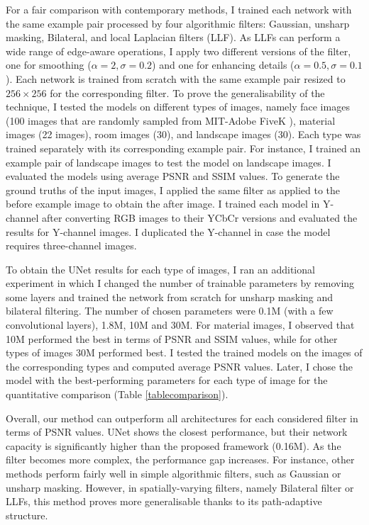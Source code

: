 For a fair comparison with contemporary methods, I trained each network with the same example pair processed by four algorithmic filters: Gaussian, unsharp masking, Bilateral, and local Laplacian filters (\gls{LLF}). As LLFs can perform a wide range of edge-aware operations, I apply two different versions of the filter, one for smoothing ($\alpha=2,  \sigma=0.2$) and one for enhancing details ($\alpha=0.5, \sigma=0.1$). Each network is trained from scratch with the same example pair resized to $256 \times 256$ for the corresponding filter. 
To prove the generalisability of the technique, I tested the models on different types of images, namely face images (100 images that are randomly sampled from MIT-Adobe FiveK \cite{Bychkovsky11Learning}), material images (22 images), room images (30), and landscape images (30). Each type was trained separately with its corresponding example pair. For instance, I trained an example pair of landscape images to test the model on landscape images. I evaluated the models using average PSNR and SSIM values. To generate the ground truths of the input images, I applied the same filter as applied to the before example image to obtain the after image. I trained each model in Y-channel after converting RGB images to their YCbCr versions and evaluated the results for Y-channel images. I duplicated the Y-channel in case the model requires three-channel images. 


To obtain the UNet results for each type of images, I ran an additional experiment in which I changed the number of trainable parameters by removing some layers and trained the network from scratch for unsharp masking and bilateral filtering. The number of chosen parameters were 0.1M (with a few convolutional layers), 1.8M, 10M and 30M. For material images, I observed that 10M performed the best in terms of PSNR and SSIM values, while for other types of images 30M performed best. I tested the trained models on the images of the corresponding types and computed average PSNR values. Later, I chose the model with the best-performing parameters for each type of image for the quantitative comparison (Table \ref{tablecomparison}).

Overall, our method can outperform all architectures for each considered filter in terms of PSNR values. UNet shows the closest performance, but their network capacity is significantly higher than the proposed framework (0.16M). As the filter becomes more complex, the performance gap increases. For instance, other methods perform fairly well in simple algorithmic filters, such as Gaussian or unsharp masking. However, in spatially-varying filters, namely Bilateral filter or LLFs, this method proves more generalisable thanks to its path-adaptive structure. 

